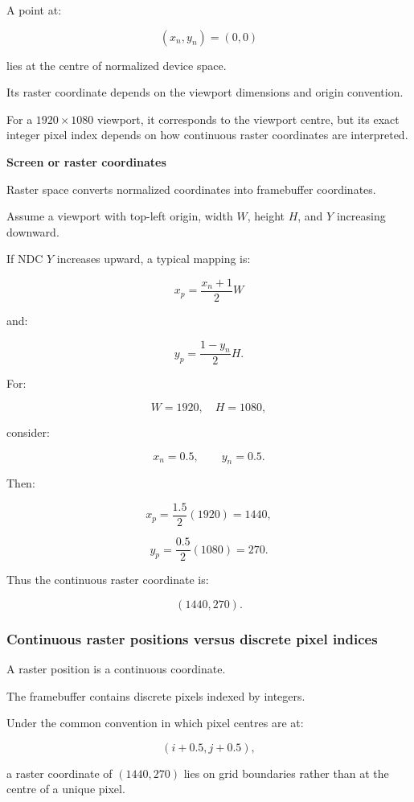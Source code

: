 A point at:

\[
 (x_n,y_n)=(0,0)
\]

lies at the centre of normalized device space.

Its raster coordinate depends on the viewport dimensions and origin convention.

For a \(1920\times1080\) viewport, it corresponds to the viewport centre, but its exact integer pixel index depends on how continuous raster coordinates are interpreted.

\textbf{Screen or raster coordinates}

Raster space converts normalized coordinates into framebuffer coordinates.

Assume a viewport with top-left origin, width \(W\), height \(H\), and \(Y\) increasing downward.

If NDC \(Y\) increases upward, a typical mapping is:

\[
 \boxed{ x_p=\frac{x_n+1}{2}W }
\]

and:

\[
 \boxed{ y_p=\frac{1-y_n}{2}H }.
\]

For:

\[
 W=1920,\quad H=1080,
\]

consider:

\[
 x_n=0.5,\qquad y_n=0.5.
\]

Then:

\[
 x_p=\frac{1.5}{2}(1920)=1440,
\]

\[
 y_p=\frac{0.5}{2}(1080)=270.
\]

Thus the continuous raster coordinate is:

\[
 \boxed{(1440,270)}.
\]

\subsubsection{Continuous raster positions versus discrete pixel indices}\label{continuous-raster-positions-versus-discrete-pixel-indices}

A raster position is a continuous coordinate.

The framebuffer contains discrete pixels indexed by integers.

Under the common convention in which pixel centres are at:

\[
 (i+0.5,j+0.5),
\]

a raster coordinate of \((1440,270)\) lies on grid boundaries rather than at the centre of a unique pixel.

